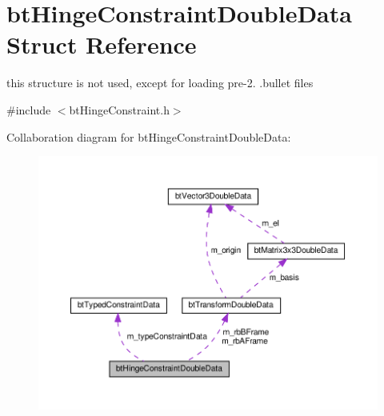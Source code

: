 \hypertarget{structbtHingeConstraintDoubleData}{}\section{bt\+Hinge\+Constraint\+Double\+Data Struct Reference}
\label{structbtHingeConstraintDoubleData}


this structure is not used, except for loading pre-\/2. .bullet files  




{\ttfamily \#include $<$bt\+Hinge\+Constraint.\+h$>$}



Collaboration diagram for bt\+Hinge\+Constraint\+Double\+Data\+:
\nopagebreak
\begin{figure}[H]
\begin{center}
\leavevmode
\includegraphics[width=350pt]{structbtHingeConstraintDoubleData__coll__graph}
\end{center}
\end{figure}
